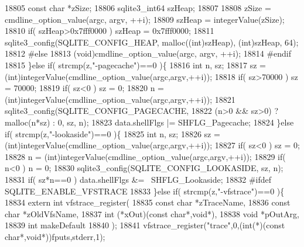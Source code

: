 \begin{DoxyCode}
{{18805       \textcolor{keyword}{const} \textcolor{keywordtype}{char} *zSize;
18806       sqlite3_int64 szHeap;
18807 
18808       zSize = cmdline_option_value(argc, argv, ++i);
18809       szHeap = integerValue(zSize);
18810       \textcolor{keywordflow}{if}( szHeap>0x7fff0000 ) szHeap = 0x7fff0000;
18811       sqlite3_config(SQLITE_CONFIG_HEAP, malloc((\textcolor{keywordtype}{int})szHeap), (\textcolor{keywordtype}{int})szHeap, 64);
18812 \textcolor{preprocessor}{#else}
18813       (void)cmdline_option_value(argc, argv, ++i);
18814 \textcolor{preprocessor}{#endif}
18815     \}\textcolor{keywordflow}{else} \textcolor{keywordflow}{if}( strcmp(z,\textcolor{stringliteral}{"-pagecache"})==0 )\{
18816       \textcolor{keywordtype}{int} n, sz;
18817       sz = (int)integerValue(cmdline_option_value(argc,argv,++i));
18818       \textcolor{keywordflow}{if}( sz>70000 ) sz = 70000;
18819       \textcolor{keywordflow}{if}( sz<0 ) sz = 0;
18820       n = (int)integerValue(cmdline_option_value(argc,argv,++i));
18821       sqlite3_config(SQLITE_CONFIG_PAGECACHE,
18822                     (n>0 && sz>0) ? malloc(n*sz) : 0, sz, n);
18823       data.shellFlgs |= SHFLG_Pagecache;
18824     \}\textcolor{keywordflow}{else} \textcolor{keywordflow}{if}( strcmp(z,\textcolor{stringliteral}{"-lookaside"})==0 )\{
18825       \textcolor{keywordtype}{int} n, sz;
18826       sz = (int)integerValue(cmdline_option_value(argc,argv,++i));
18827       \textcolor{keywordflow}{if}( sz<0 ) sz = 0;
18828       n = (int)integerValue(cmdline_option_value(argc,argv,++i));
18829       \textcolor{keywordflow}{if}( n<0 ) n = 0;
18830       sqlite3_config(SQLITE_CONFIG_LOOKASIDE, sz, n);
18831       \textcolor{keywordflow}{if}( sz*n==0 ) data.shellFlgs &= ~SHFLG_Lookaside;
18832 \textcolor{preprocessor}{#ifdef SQLITE\_ENABLE\_VFSTRACE}
18833     \}\textcolor{keywordflow}{else} \textcolor{keywordflow}{if}( strcmp(z,\textcolor{stringliteral}{"-vfstrace"})==0 )\{
18834       \textcolor{keyword}{extern} \textcolor{keywordtype}{int} vfstrace\_register(
18835          \textcolor{keyword}{const} \textcolor{keywordtype}{char} *zTraceName,
18836          \textcolor{keyword}{const} \textcolor{keywordtype}{char} *zOldVfsName,
18837          \textcolor{keywordtype}{int} (*xOut)(\textcolor{keyword}{const} \textcolor{keywordtype}{char}*,\textcolor{keywordtype}{void}*),
18838          \textcolor{keywordtype}{void} *pOutArg,
18839          \textcolor{keywordtype}{int} makeDefault
18840       );
18841       vfstrace\_register(\textcolor{stringliteral}{"trace"},0,(\textcolor{keywordtype}{int}(*)(\textcolor{keyword}{const} \textcolor{keywordtype}{char}*,\textcolor{keywordtype}{void}*))fputs,stderr,1);
}}
\end{DoxyCode}
